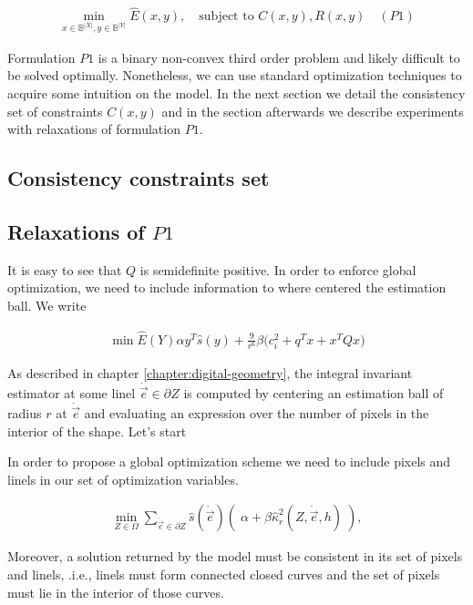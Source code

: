 \begin{align*}
	\min_{x \in \mathbb{B}^{|X|}, y \in \mathbb{B}^{|Y|}}{\hat{E}(x,y)}, \quad \text{subject to } C(x,y), R(x,y) \quad (P1)
\end{align*}

	Formulation $P1$ is a binary non-convex third order problem and likely difficult to be solved optimally. Nonetheless, we can use standard optimization techniques to acquire some intuition on the model. In the next section we detail the consistency set of constraints $C(x,y)$ and in the section afterwards we describe experiments with relaxations of formulation $P1$.
	
\subsection{Consistency constraints set}

\subsection{Relaxations of $P1$}
	
	It is easy to see that $Q$ is semidefinite positive. In order to enforce global optimization, we need to include information to where centered the estimation ball. We write
	
	\begin{align*}
		\min \hat{E}(Y) \alpha y^T\hat{s}(y) + \frac{9}{r^6}\beta \big(c_i^2 + q^Tx + x^TQx\big)
	\end{align*}
	
	

 As described in chapter \ref{chapter:digital-geometry}, the integral invariant estimator at some linel $\dot{\vec{e}} \in \partial Z$ is computed by centering an estimation ball of radius $r$ at $\dot{\vec{e}}$ and evaluating an expression over the number of pixels in the interior of the shape. Let's start 



In order to propose a global optimization scheme we need to include pixels and linels in our set of optimization variables. 


	\begin{align*}
	\min_{Z \in \Omega} \sum_{\dot{\vec{e}} \in \partial Z}{ \hat{s}( \dot{\vec{e}})\left(\; \alpha + \beta \hat{\kappa}_{r}^2(Z,\dot{\vec{e}},h) \; \right)},
	\end{align*}


Moreover, a solution returned by the model must be consistent in its set of pixels and linels, .i.e., linels must form connected closed curves and the set of pixels must lie in the interior of those curves.



